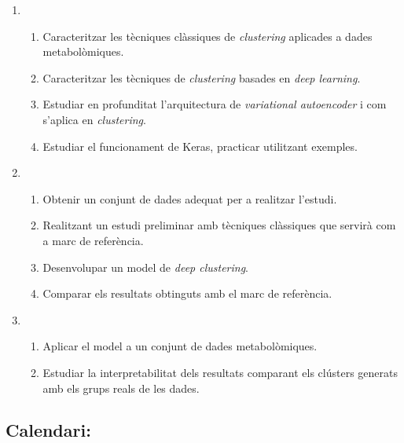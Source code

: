 \documentclass[CAT,BIB]{TFUOC}%
\begin{document}
            \begin{enumerate}
                \item %
                \begin{enumerate}
                    \item Caracteritzar les tècniques clàssiques de \textit{clustering} aplicades a dades metabolòmiques.
                    \item Caracteritzar les tècniques de \textit{clustering} basades en \textit{deep learning}.
                    \item Estudiar en profunditat l’arquitectura de \textit{variational autoencoder} i com s’aplica en \textit{clustering}.
                    \item Estudiar el funcionament de Keras, practicar utilitzant exemples.
                \end{enumerate}

                \item %
                \begin{enumerate}
                    \item Obtenir un conjunt de dades adequat per a realitzar l'estudi.
                    \item Realitzant un estudi preliminar amb tècniques clàssiques que servirà com a marc de referència.
                    \item Desenvolupar un model de \textit{deep clustering}.
                    \item Comparar els resultats obtinguts amb el marc de referència.
                \end{enumerate}

                \item %
                \begin{enumerate}
                    \item Aplicar el model a un conjunt de dades metabolòmiques.
                    \item Estudiar la interpretabilitat dels resultats comparant els clústers generats amb els grups reals de les dades.
                \end{enumerate}
            \end{enumerate}

        \subsection{Calendari:}
        \label{sec:calendari}
\end{document}

